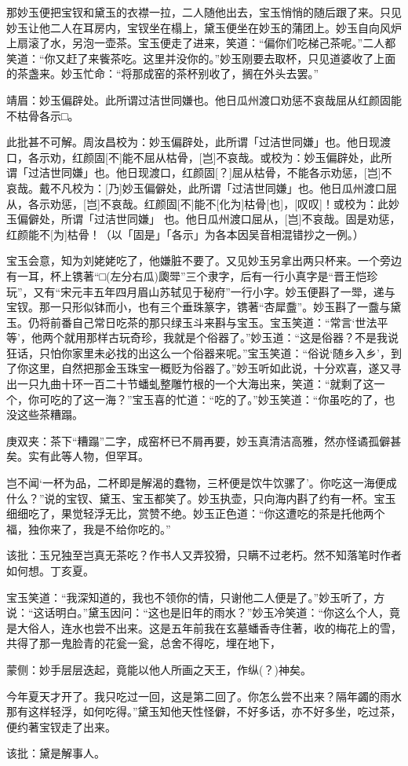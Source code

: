 \begin{parag}
    那妙玉便把宝钗和黛玉的衣襟一拉，二人随他出去，宝玉悄悄的随后跟了来。只见妙玉让他二人在耳房内，宝钗坐在榻上，黛玉便坐在妙玉的蒲团上。妙玉自向风炉上扇滚了水，另泡一壶茶。宝玉便走了进来，笑道：“偏你们吃梯己茶呢。”二人都笑道：“你又赶了来飺茶吃。这里并没你的。”妙玉刚要去取杯，只见道婆收了上面的茶盏来。妙玉忙命：“将那成窑的茶杯别收了，搁在外头去罢。”\begin{note}靖眉：妙玉偏辟处。此所谓过洁世同嫌也。他日瓜州渡口劝惩不哀哉屈从红颜固能不枯骨各示□。\end{note}\begin{subnote}此批甚不可解。周汝昌校为：妙玉偏辟处，此所谓「过洁世同嫌」也。他日现渡口，各示劝，红颜固[不]能不屈从枯骨，[岂]不哀哉。或校为：妙玉偏辟处，此所谓「过洁世同嫌」也。他日现渡口，红颜固[？]屈从枯骨，不能各示劝惩，[岂]不哀哉。戴不凡校为：[乃]妙玉偏僻处，此所谓「过洁世同嫌」也。他日瓜州渡口屈从，各示劝惩，[岂]不哀哉。红颜固[不]能不[化为]枯骨[也]，[叹叹]！或校为：此妙玉偏僻处，所谓「过洁世同嫌」 也。他日瓜州渡口屈从，[岂]不哀哉。固是劝惩，红颜能不[为]枯骨！（以「固是」「各示」为各本因吴音相混错抄之一例。）\end{subnote}宝玉会意，知为刘姥姥吃了，他嫌脏不要了。又见妙玉另拿出两只杯来。一个旁边有一耳，杯上镌著“□(左分右瓜)瓟斝”三个隶字，后有一行小真字是“晋王恺珍玩”，又有“宋元丰五年四月眉山苏轼见于秘府”一行小字。妙玉便斟了一斝，递与宝钗。那一只形似钵而小，也有三个垂珠篆字，镌著“杏犀䀉”。妙玉斟了一䀉与黛玉。仍将前番自己常日吃茶的那只绿玉斗来斟与宝玉。宝玉笑道：“常言‘世法平等’，他两个就用那样古玩奇珍，我就是个俗器了。”妙玉道：“这是俗器？不是我说狂话，只怕你家里未必找的出这么一个俗器来呢。”宝玉笑道：“俗说‘随乡入乡’，到了你这里，自然把那金玉珠宝一概贬为俗器了。”妙玉听如此说，十分欢喜，遂又寻出一只九曲十环一百二十节蟠虬整雕竹根的一个大海出来，笑道：“就剩了这一个，你可吃的了这一海？”宝玉喜的忙道：“吃的了。”妙玉笑道：“你虽吃的了，也没这些茶糟蹋。\begin{note}庚双夹：茶下“糟蹋”二字，成窑杯已不屑再要，妙玉真清洁高雅，然亦怪谲孤僻甚矣。实有此等人物，但罕耳。\end{note}岂不闻‘一杯为品，二杯即是解渴的蠢物，三杯便是饮牛饮骡了’。你吃这一海便成什么？”说的宝钗、黛玉、宝玉都笑了。妙玉执壶，只向海内斟了约有一杯。宝玉细细吃了，果觉轻浮无比，赏赞不绝。妙玉正色道：“你这遭吃的茶是托他两个福，独你来了，我是不给你吃的。”\begin{note}该批：玉兄独至岂真无茶吃？作书人又弄狡猾，只瞒不过老朽。然不知落笔时作者如何想。丁亥夏。\end{note}宝玉笑道：“我深知道的，我也不领你的情，只谢他二人便是了。”妙玉听了，方说：“这话明白。”黛玉因问：“这也是旧年的雨水？”妙玉冷笑道：“你这么个人，竟是大俗人，连水也尝不出来。这是五年前我在玄墓蟠香寺住著，收的梅花上的雪，共得了那一鬼脸青的花瓮一瓮，总舍不得吃，埋在地下，\begin{note}蒙侧：妙手层层迭起，竟能以他人所画之天王，作纵(？)神矣。\end{note}今年夏天才开了。我只吃过一回，这是第二回了。你怎么尝不出来？隔年蠲的雨水那有这样轻浮，如何吃得。”黛玉知他天性怪僻，不好多话，亦不好多坐，吃过茶，便约著宝钗走了出来。\begin{note}该批：黛是解事人。\end{note}
\end{parag}


